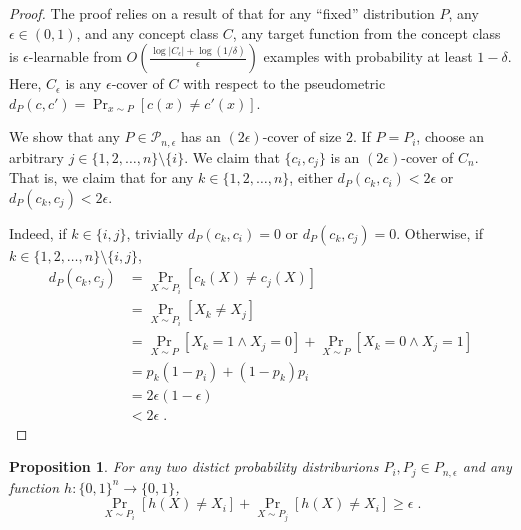 \documentclass[12pt]{article}
\newtheorem{proposition}{Proposition}
\renewcommand{\P}{\mathcal{P}}
\begin{document}
\begin{proof}
The proof relies on a result of \cite{Benedek-Itai-1991} that for any ``fixed''
distribution $P$, any $\epsilon \in (0,1)$, and any concept class $C$, any
target function from the concept class is $\epsilon$-learnable from $O \left(
\frac{\log |C_\epsilon| + \log (1/\delta)}{\epsilon}\right)$ examples with
probability at least $1-\delta$. Here, $C_\epsilon$ is any $\epsilon$-cover of
$C$ with respect to the pseudometric $d_P(c,c') = \Pr_{x \sim P}[c(x) \neq
c'(x)]$.

We show that any $P \in \P_{n,\epsilon}$ has an $(2\epsilon)$-cover of size $2$.
If $P = P_i$, choose an arbitrary $j \in \{1,2,\dots,n\} \setminus \{i\}$. We
claim that $\{c_i, c_j\}$ is an $(2\epsilon)$-cover of $C_n$. That is, we claim
that for any $k \in \{1,2,\dots,n\}$, either $d_P(c_k,c_i) < 2\epsilon$ or
$d_P(c_k,c_j) < 2\epsilon$.

Indeed, if $k \in \{i,j\}$, trivially $d_P(c_k,c_i) = 0$ or $d_P(c_k,c_j) = 0$.
Otherwise, if  $k \in \{1,2,\dots,n\} \setminus \{i,j\}$,
\begin{align*}
d_P(c_k, c_j)
& = \Pr_{X \sim P_i}[c_k(X) \neq c_j(X)] \\
& = \Pr_{X \sim P_i}[X_k \neq X_j] \\
& = \Pr_{X \sim P}[X_k = 1 \wedge X_j = 0] + \Pr_{X \sim P}[X_k = 0 \wedge X_j = 1] \\
& = p_k(1 - p_i) + (1 - p_k) p_i \\
& = 2 \epsilon (1-\epsilon) \\
& < 2 \epsilon \; .
\end{align*}
\end{proof}

\begin{proposition}
For any two distict probability distriburions
$P_i,P_j \in P_{n,\epsilon}$ and any function $h:\{0,1\}^n \to \{0,1\}$,
$$
\Pr_{X \sim P_i}[h(X) \neq X_i] + \Pr_{X \sim P_j}[h(X) \neq X_i] \ge \epsilon \; .
$$
\end{proposition}
\end{document}
